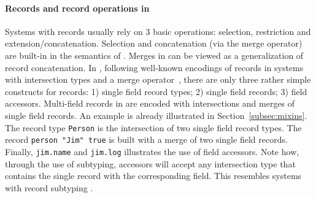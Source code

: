 \paragraph{Records and record operations in \name}
Systems with records usually rely on 3 basic operations: selection,
restriction and extension/concatenation.  Selection and concatenation
(via the merge operator) are built-in in the semantics of
\name. Merges in \name can be viewed as a generalization of record
concatenation.  In \name, following well-known encodings of records in
systems with intersection types and a merge
operator~\cite{}, there are only three rather simple constructs
for records: 1) single field record types; 2) single field records; 3)
field accessors. Multi-field records in \name are encoded with
intersections and merges of single field records. An example is
already illustrated in Section~\ref{subsec:mixins}.  The record type
\lstinline$Person$ is the intersection of two single field record
types. The record \lstinline$person "Jim" true$ is built with a merge
of two single field records. Finally, \lstinline{jim.name} and
\lstinline{jim.log} illustrates the use of field accessors.  Note how,
through the use of subtyping, accessors will accept any intersection
type that contains the single record with the corresponding field.
This resembles systems with record subtyping
\cite{cardelli1990operations,pierce1994simple}.


